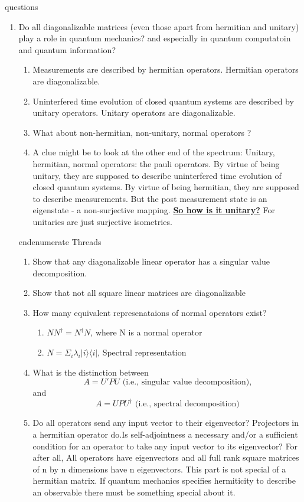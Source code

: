 \documentclass[a4paper,12pt]{amsbook}
\newcommand{\0}{{$|0\rangle$}}
\newcommand{\1}{{$|1\rangle$}}
\begin{document}
questions
    \begin{enumerate}
    item Why do we need a matrix to be diagonalizable to use it in quantum mechanics? In other words, why is spectral decomposition necessary to model the dynamics [be ituninterfered time evolution, or measurement] of a closed quantum system.
    \item Do all diagonalizable matrices (even those apart from hermitian and unitary) play a role in quantum mechanics? and especially in quantum computatoin and quantum information?
    \begin{enumerate}
    \item Measurements are described by hermitian operators. Hermitian operators are diagonalizable.
    \item Uninterfered time evolution of closed quantum systems are described by unitary operators. Unitary operators are diagonalizable.
    \item What about non-hermitian, non-unitary, normal operators ?
    \item A clue might be to look at the other end of the spectrum: Unitary, hermitian, normal operators: the pauli operators. By virtue of being unitary, they are supposed to describe uninterfered time evolution of closed quantum systems. By virtue of being hermitian, they are supposed to describe measurements. But the post measurement state is an eigenstate - a non-surjective mapping. \underline{\textbf{So how is it unitary?}} For unitaries are just surjective isometries.
    \end{enumerate}
    end{enumerate}
Threads
\begin{enumerate}
\item Show that any diagonalizable linear operator has a singular value decomposition.
\item Show that not all square linear matrices are diagonalizable
\item How many equivalent represenataions of normal operators exist?
\begin{enumerate}
\item $NN^\dagger = N^\dagger N$, where N is a normal operator
\item $N = \Sigma_i \lambda_i |i\rangle \langle i|$, Spectral representation
\end{enumerate}
\item What is the distinction between $$ A = U'PU \text{ (i.e., singular value decomposition),}$$ and $$A = UPU^\dag\text{ (i.e., spectral decomposition)}$$
\item Do all operators send any input vector to their eigenvector? Projectors in a hermitian operator do.\footnotemark[1] Is self-adjointness a necessary and/or a sufficient condition for an operator to take any input vector to its eigenvector? For after all, All operators have eigenvectors and all full rank square matrices of n by n dimensions have n eigenvectors. This part is not special of a hermitian matrix. If quantum mechanics specifies hermiticity to describe an observable there must be something special about it.

\end{enumerate}
\end{enumerate}
\end{document}
